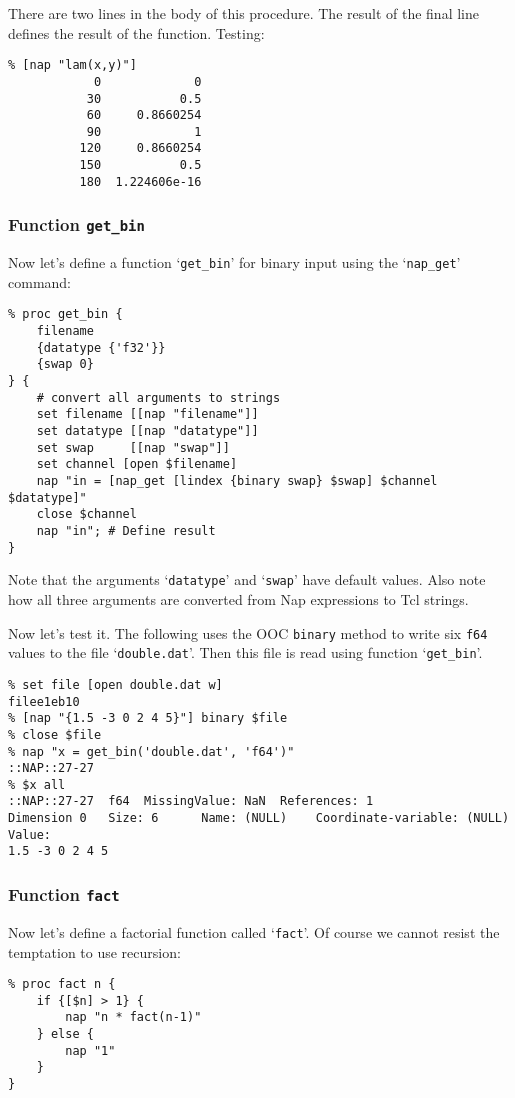 There are two lines in the body of this procedure. The result of
the final line defines the result of the function. Testing:
  \begin{verbatim}
% [nap "lam(x,y)"]
            0             0
           30           0.5
           60     0.8660254
           90             1
          120     0.8660254
          150           0.5
          180  1.224606e-16
\end{verbatim}

\subsubsection{Function \texttt{get\_bin}}
    \label{writing-procs-get-bin}

Now let's define a function `\texttt{get\_bin}' for binary input using the `\texttt{nap\_get}' command:
  \begin{verbatim}
% proc get_bin {
    filename
    {datatype {'f32'}}
    {swap 0}
} {
    # convert all arguments to strings
    set filename [[nap "filename"]]
    set datatype [[nap "datatype"]]
    set swap     [[nap "swap"]]
    set channel [open $filename]
    nap "in = [nap_get [lindex {binary swap} $swap] $channel $datatype]"
    close $channel
    nap "in"; # Define result
}
\end{verbatim}

Note that the arguments `\texttt{datatype}' and `\texttt{swap}' have default values. Also note how all three
  arguments are converted from Nap expressions to Tcl strings.
  

Now let's test it. The following uses the OOC 
  \texttt{binary} method to write six 
  \texttt{f64} values to the file `\texttt{double.dat}'. Then this file is read using function
  `\texttt{get\_bin}'.
  \begin{verbatim}
% set file [open double.dat w]
filee1eb10
% [nap "{1.5 -3 0 2 4 5}"] binary $file
% close $file
% nap "x = get_bin('double.dat', 'f64')"
::NAP::27-27
% $x all
::NAP::27-27  f64  MissingValue: NaN  References: 1
Dimension 0   Size: 6      Name: (NULL)    Coordinate-variable: (NULL)
Value:
1.5 -3 0 2 4 5
\end{verbatim}

\subsubsection{Function \texttt{fact}}
    \label{writing-procs-fact}

Now let's define a factorial function called `\texttt{fact}'. Of course we cannot resist the temptation to
  use recursion:
  \begin{verbatim}
% proc fact n {
    if {[$n] > 1} {
        nap "n * fact(n-1)"
    } else {
        nap "1"
    }
}
\end{verbatim}


